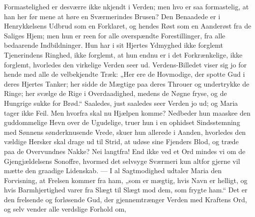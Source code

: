 \documentclass[12pt,a4paper]{book}
\begin{document}
Formastelighed er desværre ikke nkjendt i Verden; men hvo er saa formastelig, at
han her før mene at høre en Sværmerindes Brusen? Den Benaadede er i
Henrykkelsens Udbrud som en Forklaret, og hendes Røst som en Aanderøst fra de
Saliges Hjem; men hun er reen for alle overspændte Forestillinger, fra alle
bedaarende Indbildninger. Hun har i sit Hjertes Ydmyghed ikke forglemt
Tjenerindens Ringhed, ikke forglemt, at hun endnu er i det Forkrænkelige, ikke
forglemt, hvorledes den virkelige Verden seer ud. Verdens-Billedet viser sig jo
for hende med alle de velbekjendte Træk: „Her ere de Hovmodige, der spotte Gud i
deres Hjertes Tanker; her sidde de Mægtige paa deres Throuer og undertrykke de
Ringe; her svælge de Rige i Overdaadighed, medens de Nøgne fryse, og de Hungrige
sukke for Brød.“ Saaledes, just saaledes seer Verden jo ud; og Maria tager ikke
Feil. Men hvorfra skal nu Hjælpen komme? Nedbeder hun maaskee den guddommelige
Hevn over de Ugudelige, truer hun i en ophidset Sindsstemning med Sønnens
sønderknusende Vrede, skuer hun allerede i Aanden, hvorledes den vældige Hersker
skal drage ud til Strid, at udøse sine Fjenders Blod, og træde paa de Overvundnes
Nakke? Nei langtfra! End ikke ved et Ord mindes vi om de Gjengjældelsens
Sonoffre, hvormed det selvsyge
Sværmeri kun altfor gjerne vil mætte den graadige Lidenskab. --- I al
Sagtmodighed udtaler Maria den Forvisning, at Frelsen kommer fra ham, „som er
mægtig, hvis Navn er helligt, og hvis Barmhjertighed varer fra Slægt til Slægt
mod dem, som frygte ham.“ Det er den frelsende og forløsende Gud, der
gjennemtrænger Verden med Kraftens Ord, og selv vender alle verdslige Forhold om,
\end{document}

